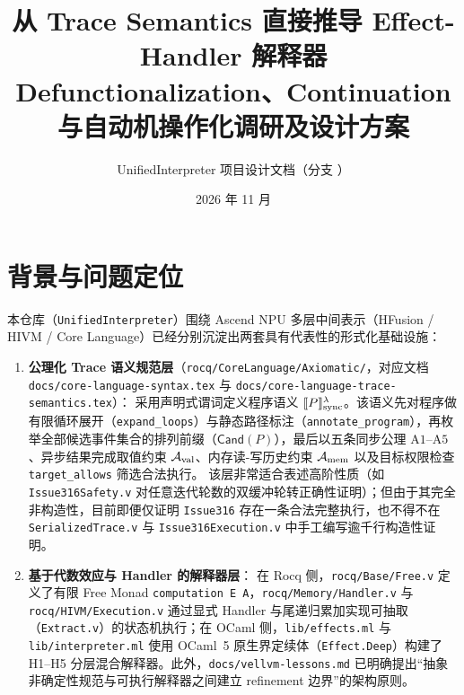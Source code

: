 \documentclass[UTF8,a4paper,11pt,fontset=fandol]{ctexart}
\title{从 Trace Semantics 直接推导 Effect-Handler 解释器\\[0.35em]
\large Defunctionalization、Continuation 与自动机操作化调研及设计方案}
\author{UnifiedInterpreter 项目设计文档（分支 \code{feat/derived-interpreter}）}
\date{2026 年 11 月}
\newcommand{\code}[1]{\texttt{#1}}
\newcommand{\pathcode}[1]{\nolinkurl{#1}}
\newcommand{\sem}[1]{\llbracket #1\rrbracket}
\newcommand{\Cand}{\mathsf{Cand}}
\begin{document}
\maketitle
\vspace{-1.2em}
\tableofcontents
\vspace{0.8em}

\section{背景与问题定位}

本仓库（\code{UnifiedInterpreter}）围绕 Ascend NPU 多层中间表示（HFusion / HIVM / Core Language）已经分别沉淀出两套具有代表性的形式化基础设施：

\begin{enumerate}
\item \textbf{公理化 Trace 语义规范层}（\pathcode{rocq/CoreLanguage/Axiomatic/}，对应文档 \pathcode{docs/core-language-syntax.tex} 与 \pathcode{docs/core-language-trace-semantics.tex}）：
  采用声明式谓词定义程序语义 $\sem{P}_{\rm sync}^\lambda$。该语义先对程序做有限循环展开（\code{expand\_loops}）与静态路径标注（\code{annotate\_program}），再枚举全部候选事件集合的排列前缀（$\Cand(P)$），最后以五条同步公理 $\mathrm{A1}$--$\mathrm{A5}$、异步结果完成取值约束 $\mathcal A_{\rm val}$、内存读-写历史约束 $\mathcal A_{\rm mem}$ 以及目标权限检查 \code{target\_allows} 筛选合法执行。
  该层非常适合表述高阶性质（如 \code{Issue316Safety.v} 对任意迭代轮数的双缓冲轮转正确性证明）；但由于其完全非构造性，目前即便仅证明 \code{Issue316} 存在一条合法完整执行，也不得不在 \code{SerializedTrace.v} 与 \code{Issue316Execution.v} 中手工编写逾千行构造性证明。

\item \textbf{基于代数效应与 Handler 的解释器层}：
  在 Rocq 侧，\code{rocq/Base/Free.v} 定义了有限 Free Monad \code{computation E A}，\code{rocq/Memory/Handler.v} 与 \code{rocq/HIVM/Execution.v} 通过显式 Handler 与尾递归累加实现可抽取（\code{Extract.v}）的状态机执行；在 OCaml 侧，\code{lib/effects.ml} 与 \code{lib/interpreter.ml} 使用 OCaml~5 原生界定续体（\code{Effect.Deep}）构建了 H1--H5 分层混合解释器。此外，\code{docs/vellvm-lessons.md} 已明确提出“抽象非确定性规范与可执行解释器之间建立 refinement 边界”的架构原则。
\end{enumerate}
\end{document}
